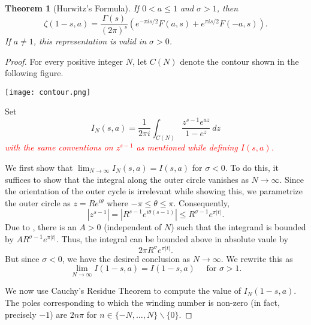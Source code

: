 \documentclass[12pt]{article}
\theoremstyle{thmstyle}
\newtheorem{theorem}{Theorem}[section]
\theoremstyle{defstyle}
\newcommand{\caution}[1]{\textcolor{red}{\textit{#1}}}
\renewcommand{\le}{\leqslant}
\begin{document}
\begin{theorem}[Hurwitz's Formula]
    If $0 < a\le 1$ and $\sigma > 1$, then 
    \begin{equation*}
        \zeta(1 - s, a) = \frac{\Gamma(s)}{(2\pi)^s}\left(e^{-\pi is/2}F(a, s) + e^{\pi i s/2}F(-a, s)\right).
    \end{equation*}
    If $a\ne 1$, this representation is valid in $\sigma > 0$.
\end{theorem}
\begin{proof}
    For every positive integer $N$, let $C(N)$ denote the contour shown in the following figure.
    \begin{center}
        \texttt{[image: contour.png]}
    \end{center}

    Set 
    \begin{equation*}
        I_N(s, a) = \frac{1}{2\pi i}\int_{C(N)}\frac{z^{s - 1}e^{az}}{1 - e^z}~dz
    \end{equation*}
    \caution{with the same conventions on $z^{s - 1}$ as mentioned while defining $I(s, a)$.}

    We first show that $\displaystyle\lim_{N\to\infty} I_N(s, a) = I(s, a)$ for $\sigma < 0$. To do this, it suffices to show that the integral along the outer circle vanishes as $N\to\infty$. Since the orientation of the outer cycle is irrelevant while showing this, we parametrize the outer circle as $z = Re^{i\theta}$ where $-\pi\le\theta\le\pi$. Consequently, 
    \begin{equation*}
        |z^{s - 1}| = |R^{s - 1}e^{i\theta(s - 1)}|\le R^{\sigma - 1}e^{\pi|t|}.
    \end{equation*}
    Due to , there is an $A > 0$ (independent of $N$) such that the integrand is bounded by $AR^{\sigma - 1}e^{\pi|t|}$. Thus, the integral can be bounded above in absolute vaule by 
    \begin{equation*}
        2\pi R^\sigma e^{\pi|t|}.
    \end{equation*}
    But since $\sigma < 0$, we have the desired conclusion as $N\to\infty$. We rewrite this as 
    \begin{equation*}
        \lim_{N\to\infty} I(1 - s, a) = I(1 - s, a)\quad\text{ for } \sigma > 1.
    \end{equation*}

    We now use Cauchy's Residue Theorem to compute the value of $I_N(1 - s, a)$. The poles corresponding to which the winding number is non-zero (in fact, precisely $-1$) are $2n\pi$ for $n\in\{-N,\dots, N\}\backslash\{0\}$. 


\end{proof}
\end{document}

